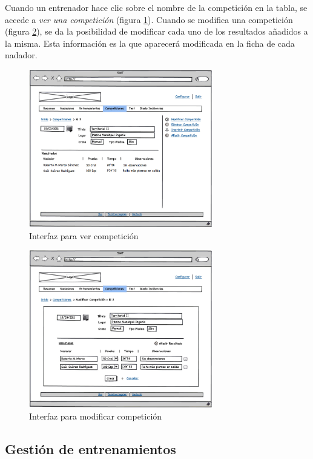 Cuando un entrenador hace clic sobre el nombre de la competición en la tabla, se accede a {\it ver una competición} (figura \ref{fig:interfaz_competiciones_show}). Cuando se modifica una competición (figura \ref{fig:interfaz_competiciones_modif}), se da la posibilidad de modificar cada uno de los resultados añadidos a la misma. Esta información es la que aparecerá modificada en la ficha de cada nadador.

		\begin{figure}[H]
		  \centering
		    \includegraphics[width=8cm]{./eps/p_interfaz/16_Competiciones_show.eps}
		  \caption{Interfaz para ver competición}
		  \label{fig:interfaz_competiciones_show}
		\end{figure}

		\begin{figure}[H]
		  \centering
		    \includegraphics[width=8cm]{./eps/p_interfaz/17_Competiciones_modif.eps}
		  \caption{Interfaz para modificar competición}
		  \label{fig:interfaz_competiciones_modif}
		\end{figure}
	
	\subsection{Gestión de entrenamientos} %
		\label{sub:gestion_de_entrenamientos}
	
